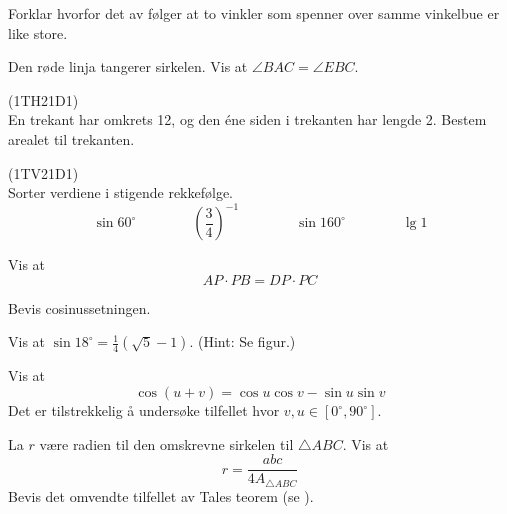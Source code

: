 Forklar hvorfor det av  følger at to vinkler som spenner over samme vinkelbue er like store.

 \vs
{}

Den røde linja tangerer sirkelen. Vis at $ \angle BAC=\angle EBC $.
\newpage

(1TH21D1) \\
En trekant har omkrets 12, og den éne siden i trekanten har lengde 2. Bestem arealet til trekanten.


(1TV21D1)\\
Sorter verdiene i stigende rekkefølge.
\[ \sin 60^\circ\qquad\qquad \left(\frac{3}{4}\right)^{-1}\qquad\qquad\sin 160^\circ\qquad\qquad \lg 1\]

Vis at 
\[ AP\cdot PB = DP\cdot PC \]

Bevis cosinussetningen.

Vis at $ \sin 18^\circ=\frac{1}{4}(\sqrt{5}-1) $. (Hint: Se figur.)

Vis at
\[ \cos(u+v)= \cos u\cos v-\sin u \sin v \]
Det er tilstrekkelig å undersøke tilfellet hvor $ v,u \in [0^\circ, 90^\circ] $.

\newpage
{}
La $ r $ være radien til den omskrevne sirkelen til $ \triangle ABC $. Vis at
\[ r=\frac{abc}{4A_{\triangle ABC}} \]
Bevis det omvendte tilfellet av Tales teorem (se  ).





